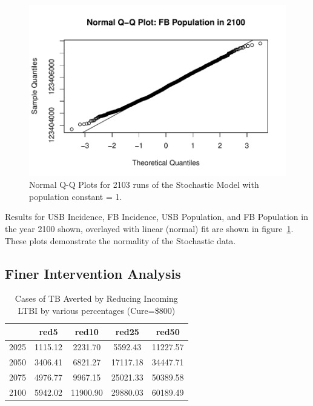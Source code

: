 \documentclass{amsart}
\begin{document}
\begin{figure}
    \includegraphics[scale=0.4]{figures/qqnormFBPop.pdf}
  \caption{Normal Q-Q Plots for 2103 runs of the Stochastic Model with population constant = 1.}
  \label{fig:qqnormPlots}
\end{figure}

Results for USB Incidence, FB Incidence, USB Population, and FB Population in the year
2100 shown, overlayed with linear (normal) fit are shown in
figure~\ref{fig:qqnormPlots}. These plots demonstrate the normality of the
Stochastic data. 
\subsection{Finer Intervention Analysis}

\begin{table}
\centering
\begin{tabular}{|r|cccc|} \hline
       & red5    & red10    & red25    & red50    \\ \hline
  2025 & 1115.12 & 2231.70  & 5592.43  & 11227.57 \\ 
  2050 & 3406.41 & 6821.27  & 17117.18 & 34447.71 \\ 
  2075 & 4976.77 & 9967.15  & 25021.33 & 50389.58 \\ 
  2100 & 5942.02 & 11900.90 & 29880.03 & 60189.49 \\ 
   \hline
\end{tabular}
\caption{Cases of TB Averted by Reducing Incoming LTBI by various percentages
         (Cure=\$800)} 
\label{tab:caRed}
\end{table}
\end{document}
